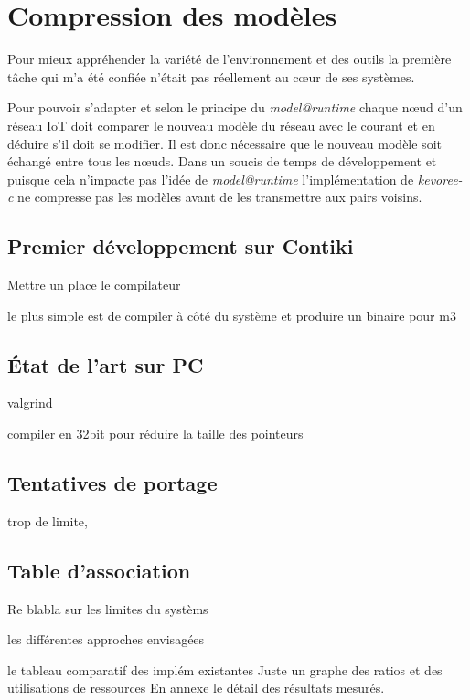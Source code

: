 \section{Compression des modèles}

Pour mieux appréhender la variété de l'environnement et des outils la première tâche qui m'a été confiée n'était pas réellement au cœur de ses systèmes.

Pour pouvoir s'adapter et selon le principe du \emph{model@runtime} chaque nœud d'un réseau IoT doit comparer le nouveau modèle du réseau avec le courant et en déduire s'il doit se modifier. Il est donc nécessaire que le nouveau modèle soit échangé entre tous les nœuds. Dans un soucis de temps de développement et puisque cela n'impacte pas l'idée de \emph{model@runtime} l'implémentation de \emph{kevoree-c} ne compresse pas les modèles avant de les transmettre aux pairs voisins.

\subsection{Premier développement sur Contiki}

Mettre un place le compilateur

le plus simple est de compiler à côté du système et produire un binaire pour m3

\subsection{État de l'art sur PC}

valgrind

compiler en 32bit pour réduire la taille des pointeurs

\subsection{Tentatives de portage}

trop de limite, 

\subsection{Table d'association}

Re blabla sur les limites du systèms

les différentes approches envisagées 

le tableau comparatif des implém existantes
Juste un graphe des ratios et des utilisations de ressources
En annexe le détail des résultats mesurés.


